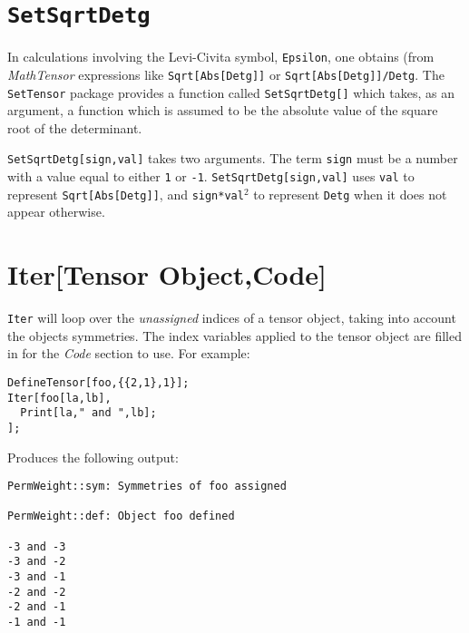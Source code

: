 
\section{\tt SetSqrtDetg}

In calculations involving the Levi-Civita symbol, {\tt Epsilon}, one
obtains (from {\it MathTensor} expressions like {\tt Sqrt[Abs[Detg]]}
or {\tt Sqrt[Abs[Detg]]/Detg}.  The {\tt SetTensor} package provides
a function called {\tt SetSqrtDetg[]} which takes, as an argument,
a function which is assumed to be the absolute value of the square
root of the determinant.

{\tt SetSqrtDetg[sign,val]} takes two arguments.  The term
{\tt sign} must be a number with a value equal to either {\tt 1}
or {\tt -1}.
{\tt SetSqrtDetg[sign,val]} uses {\tt val} to represent
{\tt Sqrt[Abs[Detg]]}, and
{\tt sign*val${}^2$} to represent {\tt Detg} when it does not appear
otherwise.


\section{Iter[Tensor Object,Code]}
{\tt Iter} will loop over the {\em unassigned} indices of a tensor object,
taking into account the objects symmetries.  The index variables
applied to the tensor object are filled in for the {\it Code} section to
use.  For example:
\begin{verbatim}
DefineTensor[foo,{{2,1},1}];
Iter[foo[la,lb],
  Print[la," and ",lb];
];
\end{verbatim}
Produces the following output:
\begin{verbatim}
PermWeight::sym: Symmetries of foo assigned

PermWeight::def: Object foo defined

-3 and -3
-3 and -2
-3 and -1
-2 and -2
-2 and -1
-1 and -1
\end{verbatim}

